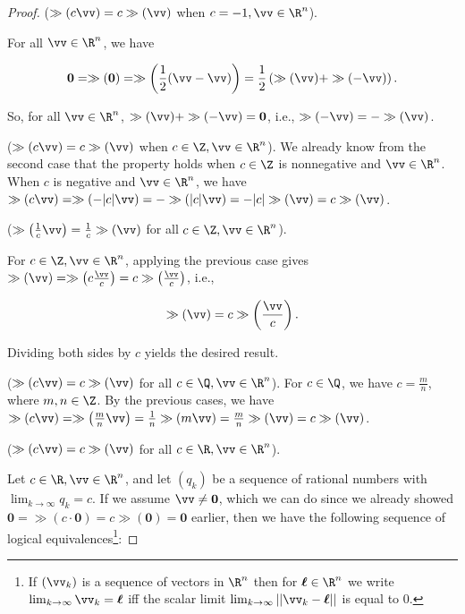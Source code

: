 \begin{proof}
{		\vspace{.25cm}
		
		($\gg(c\vv) = c\gg(\vv)$ when $c = -1, \vv \in \R^n$).
		\fullindent
		{
			For all $\vv \in \R^n$, we have
			
			\begin{align*}
				\mathbf{0} = \gg(\mathbf{0}) = \gg\left(\frac{1}{2}(\vv - \vv)\right) = \frac{1}{2}\left(\gg(\vv) + \gg(-\vv)\right).
			\end{align*} 
			
			So, for all $\vv \in \R^n$, $\gg(\vv) + \gg(-\vv) = \mathbf{0}$, i.e., $\gg(-\vv) = -\gg(\vv)$. 
		}
		
		\vspace{.25cm}
		
		($\gg(c\vv) = c\gg(\vv)$ when $c \in \Z, \vv \in \R^n$).
		\fullindent
		{
			We already know from the second case that the property holds when $c \in \Z$ is nonnegative and $\vv \in \R^n$. When $c$ is negative and $\vv \in \R^n$, we have $\gg(c\vv) = \gg(-|c|\vv) = -\gg(|c|\vv) = -|c|\gg(\vv) = c\gg(\vv)$.
		}
		
		\vspace{.25cm}
		
		($\gg\left(\frac{1}{c}\vv\right) = \frac{1}{c}\gg(\vv)$ for all $c \in \Z, \vv \in \R^n$).
		\fullindent
		{		
			For $c \in \Z, \vv \in \R^n$, applying the previous case gives $\gg(\vv) = \gg\left(c\frac{\vv}{c}\right) = c\gg\left(\frac{\vv}{c}\right)$, i.e., 
			
			\begin{align*}
				\gg(\vv) = c\gg\left(\frac{\vv}{c}\right).
			\end{align*}
			
			Dividing both sides by $c$ yields the desired result.
		}
		
		\vspace{.25cm}
		
		($\gg(c\vv) = c\gg(\vv)$ for all $c \in \Q, \vv \in \R^n$).
		\fullindent
		{		
			For $c \in \Q$, we have $c = \frac{m}{n}$, where $m, n \in \Z$. By the previous cases, we have $\gg(c\vv) = \gg\left(\frac{m}{n}\vv\right) = \frac{1}{n}\gg\left(m\vv\right) = \frac{m}{n}\gg(\vv) = c\gg(\vv)$.
		}
	}
	
	\vspace{.5cm}
	
	($\gg(c\vv) = c\gg(\vv)$ for all $c \in \R, \vv \in \R^n$).
	\fullindent
	{
		Let $c \in \R, \vv \in \R^n$, and let $(q_k)$ be a sequence of rational numbers with $\lim_{k \rightarrow \infty} q_k = c$. If we assume $\vv \neq \mathbf{0}$, which we can do since we already showed $\mathbf{0} = \gg(c \cdot \mathbf{0}) = c\gg(\mathbf{0}) = \mathbf{0}$ earlier, then we have the following sequence of logical equivalences\footnote{If $(\vv_k)$ is a sequence of vectors in $\R^n$ then for $\boldsymbol{\ell} \in \R^n$ we write $\lim_{k \rightarrow \infty} \vv_k = \boldsymbol{\ell}$ iff the scalar limit $\lim_{k \rightarrow \infty} ||\vv_k - \boldsymbol{\ell}||$ is equal to $0$.}:
			
}
\end{proof}
